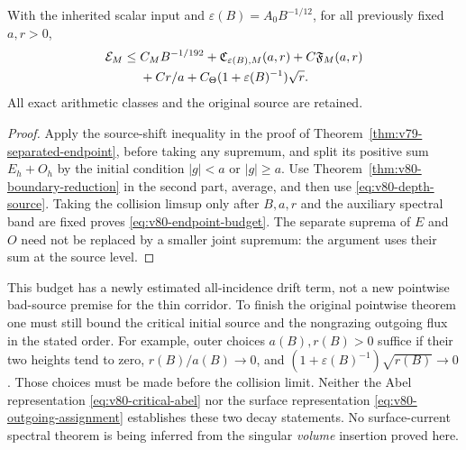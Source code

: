 \begin{corollary}
\label{cor:v80-endpoint-budget}
With the inherited scalar input and $\varepsilon(B)=A_0B^{-1/12}$,
for all previously fixed $a,r>0$,
\begin{align}
 \mathcal E_M\le{}&C_MB^{-1/192}
      +\mathfrak C_{\varepsilon(B),M}(a,r)
      +C\mathfrak F_M(a,r)\notag\\
      &+C r/a+C_\Theta(1+\varepsilon(B)^{-1})\sqrt r.
                                      \label{eq:v80-endpoint-budget}
\end{align}
All exact arithmetic classes and the original source are retained.
\end{corollary}
\begin{proof}
Apply the source-shift inequality in the proof of
Theorem~\ref{thm:v79-separated-endpoint}, before taking any
supremum, and split its positive sum $E_h+O_h$ by the initial
condition $|g|<a$ or $|g|\ge a$. Use
Theorem~\ref{thm:v80-boundary-reduction} in the second part,
average, and then use \eqref{eq:v80-depth-source}. Taking the
collision limsup only after $B,a,r$ and the auxiliary spectral band
are fixed proves \eqref{eq:v80-endpoint-budget}. The separate
suprema of $E$ and $O$ need not be replaced by a smaller joint
supremum: the argument uses their sum at the source level.
\end{proof}

This budget has a newly estimated all-incidence drift term, not a
new pointwise bad-source premise for the thin corridor. To finish
the original pointwise theorem one must still bound the critical
initial source and the nongrazing outgoing flux in the stated order.
For example, outer choices $a(B),r(B)>0$ suffice if their two heights
tend to zero, $r(B)/a(B)\to0$, and
$(1+\varepsilon(B)^{-1})\sqrt{r(B)}\to0$. Those choices must be
made before the collision limit. Neither the Abel representation
\eqref{eq:v80-critical-abel} nor the surface representation
\eqref{eq:v80-outgoing-assignment} establishes these two decay
statements. No surface-current spectral theorem is being inferred
from the singular \emph{volume} insertion proved here.
